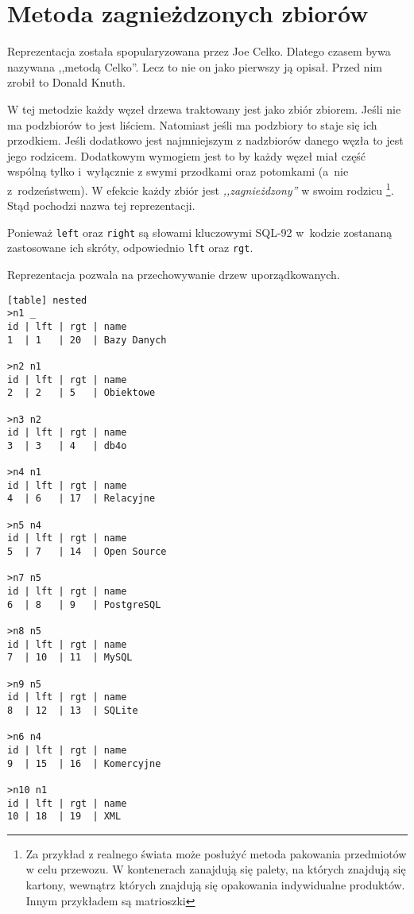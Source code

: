 \section{Metoda zagnieżdzonych zbiorów}

Reprezentacja została spopularyzowana przez Joe Celko\cite{celko-sql}.
Dlatego czasem bywa nazywana ,,metodą Celko''.
Lecz to nie on jako pierwszy ją opisał.
Przed nim zrobił to Donald Knuth\cite{knuth}.



%

W tej metodzie każdy węzeł drzewa traktowany jest jako zbiór zbiorem.
Jeśli nie ma podzbiorów to jest liściem.
Natomiast jeśli ma podzbiory to staje się ich przodkiem.
Jeśli dodatkowo jest najmniejszym z nadzbiorów danego węzła to jest jego rodzicem.
Dodatkowym wymogiem jest to by każdy węzeł miał część wspólną tylko i~wyłącznie z swymi przodkami oraz potomkami (a~nie z~rodzeństwem).
W efekcie każdy zbiór jest \emph{,,zagnieżdzony''} w swoim rodzicu%
\footnote{
    Za przykład z realnego świata może posłużyć metoda pakowania przedmiotów w celu przewozu.
    W kontenerach zanajdują się palety, na których znajdują się kartony, wewnątrz których znajdują się opakowania indywidualne produktów.
    Innym przykładem są matrioszki
}.
Stąd pochodzi nazwa tej reprezentacji.


Ponieważ \texttt{left} oraz \texttt{right} są słowami kluczowymi SQL-92
w~kodzie zostananą zastosowane ich skróty, odpowiednio \texttt{lft} oraz \texttt{rgt}.

Reprezentacja pozwala na przechowywanie drzew uporządkowanych.


\begin{verbatim}[table] nested
>n1 _
id | lft | rgt | name
1  | 1   | 20  | Bazy Danych

>n2 n1
id | lft | rgt | name
2  | 2   | 5   | Obiektowe

>n3 n2
id | lft | rgt | name
3  | 3   | 4   | db4o

>n4 n1
id | lft | rgt | name
4  | 6   | 17  | Relacyjne

>n5 n4
id | lft | rgt | name
5  | 7   | 14  | Open Source

>n7 n5
id | lft | rgt | name
6  | 8   | 9   | PostgreSQL

>n8 n5
id | lft | rgt | name
7  | 10  | 11  | MySQL

>n9 n5
id | lft | rgt | name
8  | 12  | 13  | SQLite

>n6 n4
id | lft | rgt | name
9  | 15  | 16  | Komercyjne

>n10 n1
id | lft | rgt | name
10 | 18  | 19  | XML

\end{verbatim}

